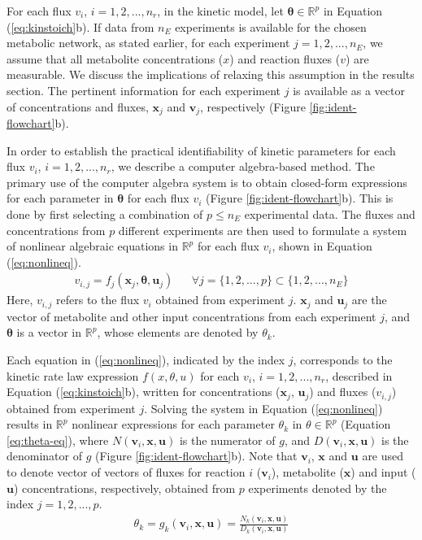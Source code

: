 \documentclass[10pt]{article}
\begin{document}
	For each flux $v_i$, $i={1, 2, ..., n_r}$, in the kinetic model, let $\mathbf{\theta} \in \mathbb{R}^p$ in Equation (\ref{eq:kinstoich}b). If data from $n_E$ experiments is available for the chosen metabolic network, as stated earlier, for each experiment $j = {1, 2, ..., n_E}$, we assume that all metabolite concentrations ($x$) and reaction fluxes ($v$) are measurable. We discuss the implications of relaxing this assumption in the results section. The pertinent information for each experiment $j$ is available as a vector of concentrations and fluxes, $\mathbf{x}_j$ and $\mathbf{v}_j$, respectively (Figure \ref{fig:ident-flowchart}b). 
	
	In order to establish the practical identifiability of kinetic parameters for each flux $v_i$, $i={1, 2, ..., n_r}$, we describe a computer algebra-based method. The primary use of the computer algebra system is to obtain closed-form expressions for each parameter in $\mathbf{\theta}$ for each flux $v_i$ (Figure \ref{fig:ident-flowchart}b). This is done by first selecting a combination of $p\le n_E$ experimental data. The fluxes and concentrations from $p$ different experiments are then used to formulate a system of nonlinear algebraic equations in $\mathbb{R}^p$ for each flux $v_i$, shown in Equation (\ref{eq:nonlineq}). 
	\begin{align}\label{eq:nonlineq}
	v_{i, j} = f_j(\mathbf{x}_j,\mathbf{\theta}, \mathbf{u}_j) && \forall j=\{1, 2, ..., p\}\subset\{1, 2, ..., n_E\}
	\end{align}
	Here, $v_{i,j}$ refers to the flux $v_i$ obtained from experiment $j$. $\mathbf{x}_j$ and $\mathbf{u}_j$ are the vector of metabolite and other input concentrations from each experiment $j$, and $\mathbf{\theta}$ is a vector in $\mathbb{R}^p$, whose elements are denoted by $\theta_k$.		
	
	Each equation in (\ref{eq:nonlineq}), indicated by the index $j$, corresponds to the kinetic rate law expression $f(x, \theta, u)$ for each $v_i$, $i={1, 2, ..., n_r}$, described in Equation (\ref{eq:kinstoich}b), written for concentrations ($\mathbf{x}_j$, $\mathbf{u}_j$) and fluxes ($v_{i,j}$) obtained from experiment $j$. Solving the system in Equation (\ref{eq:nonlineq}) results in $\mathbb{R}^p$ nonlinear expressions for each parameter $\theta_k$ in $\theta \in \mathbb{R}^p$ (Equation \ref{eq:theta-eq}), where $N(\mathbf{v}_i, \mathbf{x}, \mathbf{u})$ is the numerator of $g$, and $D(\mathbf{v}_i, \mathbf{x}, \mathbf{u})$ is the denominator of $g$ (Figure \ref{fig:ident-flowchart}b). Note that $\mathbf{v}_i$, $\mathbf{x}$ and $\mathbf{u}$ are used to denote vector of vectors of fluxes for reaction $i$ ($\mathbf{v}_i$), metabolite ($\mathbf{x}$) and input ($\mathbf{u}$) concentrations, respectively, obtained from $p$ experiments denoted by the index $j = {1, 2, ..., p}$.
	\begin{align}\label{eq:theta-eq}
	\theta_k = g_k(\mathbf{v}_i, \mathbf{x}, \mathbf{u}) = \frac{N_k(\mathbf{v}_i, \mathbf{x}, \mathbf{u})}{D_k(\mathbf{v}_i, \mathbf{x}, \mathbf{u})}
	\end{align}
\end{document}
